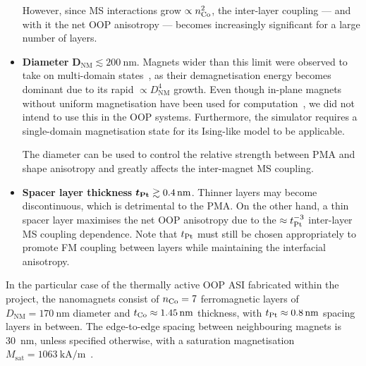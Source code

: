 \begin{itemize}
	However, since MS interactions grow $\propto n_{\ce{Co}}^2$, the inter-layer coupling --- and with it the net OOP anisotropy --- becomes increasingly significant for a large number of layers.
	\item \textbf{Diameter} $\boldsymbol{D_\mathrm{NM}} \lesssim \SI{200}{\nano\metre}$. \newline
	Magnets wider than this limit were observed to take on multi-domain states~\cite{KUR-24}, as their demagnetisation energy becomes dominant due to its rapid $\propto D_\mathrm{NM}^4$ growth.
	Even though in-plane magnets without uniform magnetisation have been used for computation~\cite{gartside2022reconfigurable}, we did not intend to use this in the OOP systems.
	Furthermore, the \hotspice simulator requires a single-domain magnetisation state for its Ising-like model to be applicable. \par
	The diameter can be used to control the relative strength between PMA and shape anisotropy and greatly affects the inter-magnet MS coupling.
	\item \textbf{Spacer layer thickness} $\boldsymbol{t_{\ce{Pt}}} \gtrsim \SI{0.4}{\nano\metre}$. \newline
	Thinner layers may become discontinuous, which is detrimental to the PMA.
	On the other hand, a thin spacer layer maximises the net OOP anisotropy due to the $\approx t_{\ce{Pt}}^{-3}$ inter-layer MS coupling dependence.
	Note that $t_{\ce{Pt}}$ must still be chosen appropriately to promote FM coupling between layers while maintaining the interfacial anisotropy. %
\end{itemize}

In the particular case of the thermally active OOP ASI fabricated within the \spinengine project, the nanomagnets consist of $n_{\ce{Co}}=7$ ferromagnetic layers of $D_\mathrm{NM}=\SI{170}{\nano\metre}$ diameter and $t_{\ce{Co}} \approx \SI{1.45}{\nano\metre}$ thickness, with $t_{\ce{Pt}} \approx \SI{0.8}{\nano\metre}$ spacing layers in between.
The edge-to-edge spacing between neighbouring magnets is \SI{30}{\nano\metre}, unless specified otherwise, with a saturation magnetisation $M_\mathrm{sat}=\SI{1063}{\kilo\ampere\per\metre}$~\cite{Msat_Co}.

